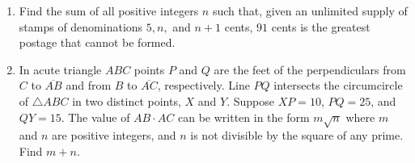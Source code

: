 \documentclass{article}%
\begin{document}
\begin{enumerate}
%
\item%
Find the sum of all positive integers $n$ such that, given an unlimited supply of stamps of denominations $5,n,$ and $n+1$ cents, $91$ cents is the greatest postage that cannot be formed.
%
\item%
In acute triangle $ABC$ points $P$ and $Q$ are the feet of the perpendiculars from $C$ to $\overline{AB}$ and from $B$ to $\overline{AC}$, respectively. Line $PQ$ intersects the circumcircle of $\triangle ABC$ in two distinct points, $X$ and $Y$. Suppose $XP=10$, $PQ=25$, and $QY=15$. The value of $AB\cdot AC$ can be written in the form $m\sqrt n$ where $m$ and $n$ are positive integers, and $n$ is not divisible by the square of any prime. Find $m+n$.
%
\end{enumerate}

%
\end{document}
